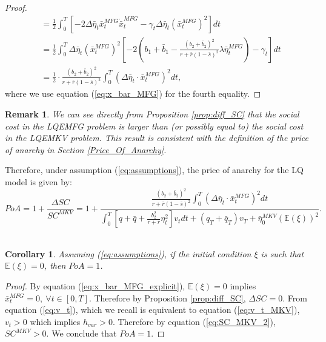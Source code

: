 \documentclass[11pt]{article}
\newtheorem{remark}{Remark}
\newtheorem{corollary}{Corollary}
\begin{document}
\begin{proof}
\begin{equation*}
\begin{split}
			&= \frac{1}{2}\int_0^T \left[- 2\Delta{\bar{\eta}}_t \bar{x}_t^{MFG} \dot{\bar{x}}_t^{MFG} - \gamma_t \Delta{\bar{\eta}}_t (\bar{x}_t^{MFG})^2 \right]dt \\
			&= \frac{1}{2} \int_0^T \Delta{\bar{\eta}}_t (\bar{x}_t^{MFG})^2 \left[-2\left(b_1 + \bar{b}_1 - \frac{(b_2+\bar{b}_2)^2}{r + \bar{r}(1-\bar{s})^2} \lambda \bar{\eta}_t^{MFG}\right) - \gamma_t\right] dt\\
			&= \frac{1}{2}\cdot \frac{(b_2 + \bar{b}_2)^2}{r + \bar{r}(1-\bar{s})^2} \int_0^T (\Delta \bar{\eta}_t \cdot \bar{x}_t^{MFG})^2 dt,
		\end{split}
	\end{equation*}
	where we use equation (\ref{eq:x_bar_MFG}) for the fourth equality.	
	
\end{proof}

\begin{remark}
	We can see directly from Proposition \ref{prop:diff_SC} that the social cost in the LQEMFG problem is larger than (or possibly equal to) the social cost in the LQEMKV problem. This result is consistent with the definition of the price of anarchy in Section \ref{Price_Of_Anarchy}.
\end{remark}

Therefore, under assumption (\ref{eq:assumptions}), the price of anarchy for the LQ model is given by:
\begin{equation}
PoA =1+ \frac{\Delta SC}{SC^{MKV}}= 1 +  \frac{ \displaystyle   \frac{(b_2 + \bar{b}_2)^2}{r + \bar{r}(1-\bar{s})^2}  \int_0^T (\Delta \bar{\eta}_t \cdot \bar{x}_t^{MFG})^2 dt }{\displaystyle \int_0^T \left[q+\bar{q} + \frac{b_2^2}{r+\bar{r}} \eta_t^2 \right] v_t dt + (q_T + \bar{q}_T) v_T + \bar{\eta}_0^{MKV} (\mathbb{E}(\xi))^2}.
\label{eq:PoA_LQ}
\end{equation}\\

\begin{corollary}
    Assuming (\ref{eq:assumptions}), if the initial condition $\xi$ is such that $\mathbb{E}(\xi)=0$, then $PoA=1$.
\end{corollary}
\begin{proof}
    By equation (\ref{eq:x_bar_MFG_explicit}), $\mathbb{E}(\xi)=0$ implies $\bar{x}^{MFG}_t=0,\ \forall t \in [0,T]$. Therefore by Proposition \ref{prop:diff_SC}, $\Delta SC=0$. From equation (\ref{eq:v_t}), which we recall is equivalent to equation (\ref{eq:v_t_MKV}), $v_t>0$ which implies $h_{var}>0$. Therefore by equation (\ref{eq:SC_MKV_2}), $SC^{MKV}>0$. We conclude that $PoA=1$.
\end{proof}
\end{document}
